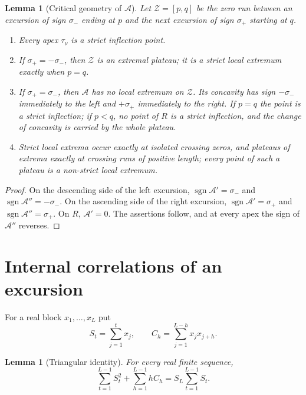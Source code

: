\documentclass[11pt]{amsart}
\numberwithin{equation}{section}
\theoremstyle{plain}
\newtheorem{lemma}[theorem]{Lemma}
\theoremstyle{definition}
\theoremstyle{remark}
\DeclareMathOperator{\sgn}{sgn}
\newcommand{\Anet}{\mathcal{A}}
\begin{document}
\begin{lemma}[Critical geometry of $\Anet$]
\label{lem:critical}
Let $\mathcal Z=[p,q]$ be the zero run between an excursion of sign $\sigma_-$ ending
at $p$ and the next excursion of sign $\sigma_+$ starting at $q$.
\begin{enumerate}[label=\textup{(\roman*)}]
\item Every apex $\tau_\nu$ is a strict inflection point.
\item If $\sigma_+=-\sigma_-$, then $\mathcal Z$ is an extremal plateau; it is a
strict local extremum exactly when $p=q$.
\item If $\sigma_+=\sigma_-$, then $\Anet$ has no local extremum on
$\mathcal Z$. Its concavity has sign $-\sigma_-$ immediately to the left
and $+\sigma_+$ immediately to the right. If $p=q$ the point is a strict inflection; if
$p<q$, no point of $R$ is a strict inflection, and the change of concavity
is carried by the whole plateau.
\item Strict local extrema occur exactly at isolated crossing zeros, and
plateaus of extrema exactly at crossing runs of positive length; every point
of such a plateau is a non-strict local extremum.
\end{enumerate}
\end{lemma}

\begin{proof}
On the descending side of the left excursion,
$\sgn\Anet'=\sigma_-$ and $\sgn\Anet''=-\sigma_-$. On the ascending side of
the right excursion, $\sgn\Anet'=\sigma_+$ and $\sgn\Anet''=\sigma_+$. On
$R$, $\Anet'=0$. The assertions follow, and at every apex the sign of
$\Anet''$ reverses.
\end{proof}

\section{Internal correlations of an excursion}
\label{sec:internal_corr}

For a real block $x_1,\dots,x_L$ put
\begin{equation}
\label{eq:block_def}
S_t=\sum_{j=1}^t x_j,\qquad
C_h=\sum_{j=1}^{L-h}x_jx_{j+h}.
\end{equation}

\begin{lemma}[Triangular identity]
\label{lem:triangular-corr}
For every real finite sequence,
\begin{equation}
\label{eq:general-triangular}
\sum_{t=1}^{L-1}S_t^2+\sum_{h=1}^{L-1}hC_h
=S_L\sum_{t=1}^{L-1}S_t.
\end{equation}
\end{lemma}
\end{document}
